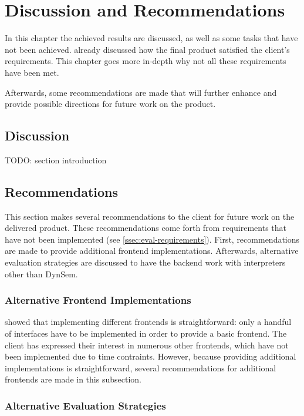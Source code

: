 \chapter{Discussion and Recommendations}
\label{cha:disc-recomm}

In this chapter the achieved results are discussed, as well as some tasks that
have not been achieved.  already discussed how the final
product satisfied the client's requirements. This chapter goes more in-depth why
not all these requirements have been met.

Afterwards, some recommendations are made that will further enhance and provide
possible directions for future work on the product.

\section{Discussion}
\label{sec:discuss-discussion}

TODO: section introduction



%

\section{Recommendations}
\label{sec:discuss-future}

This section makes several recommendations to the client for future work on the
delivered product. These recommendations come forth from requirements that have
not been implemented (see \cref{ssec:eval-requirements}). First, recommendations
are made to provide additional frontend implementations. Afterwards, alternative
evaluation strategies are discussed to have the backend work with interpreters
other than DynSem.

\subsection{Alternative Frontend Implementations}
\label{ssec:discuss-alternative-frontend}

 showed that implementing different frontends is
straightforward: only a handful of interfaces have to be implemented in order to
provide a basic frontend. The client has expressed their interest in numerous
other frontends, which have not been implemented due to time contraints.
However, because providing additional implementations is straightforward,
several recommendations for additional frontends are made in this subsection.





\subsection{Alternative Evaluation Strategies}
\label{ssec:discuss-alternate-eval}




